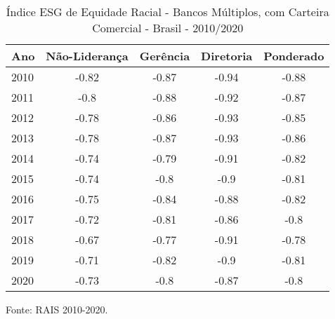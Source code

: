 \begin{table}[htb!]
\centering
\caption{Índice ESG de Equidade Racial - Bancos Múltiplos, com Carteira Comercial - Brasil - 2010/2020}
\begin{tabular}{lcccc}
\hline
    Ano  & Não-Liderança & Gerência & Diretoria & Ponderado \\ \hline
    2010 & -0.82          & -0.87    & -0.94     & -0.88    \\ 
    2011 & -0.8           & -0.88    & -0.92     & -0.87    \\ 
    2012 & -0.78          & -0.86    & -0.93     & -0.85    \\ 
    2013 & -0.78          & -0.87    & -0.93     & -0.86    \\ 
    2014 & -0.74          & -0.79    & -0.91     & -0.82    \\ 
    2015 & -0.74          & -0.8     & -0.9      & -0.81    \\ 
    2016 & -0.75          & -0.84    & -0.88     & -0.82    \\ 
    2017 & -0.72          & -0.81    & -0.86     & -0.8     \\ 
    2018 & -0.67          & -0.77    & -0.91     & -0.78    \\ 
    2019 & -0.71          & -0.82    & -0.9      & -0.81    \\ 
    2020 & -0.73          & -0.8     & -0.87     & -0.8     \\ \hline
\end{tabular}
\begin{floatnotes}
\item [Fonte:] RAIS 2010-2020.
\end{floatnotes}
\end{table}